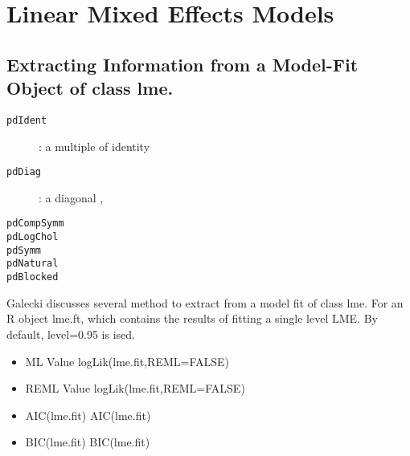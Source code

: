 \section{Linear Mixed Effects Models}
\subsection{Extracting Information from a Model-Fit Object of class lme.}


\begin{description}
\item[\texttt{pdIdent}]: a multiple of identity
\item[\texttt{pdDiag}]:  a diagonal ,

\item[\texttt{pdCompSymm}]
\item[\texttt{pdLogChol}]
\item[\texttt{pdSymm}]
\item[\texttt{pdNatural}]
\item[\texttt{pdBlocked}]
\end{description}








Galecki discusses several method to extract from a model fit of class lme.
For an R object lme.ft, which contains the results of fitting a single level LME.
By default, level=0.95 is ised.
\begin{itemize}
\item ML Value logLik(lme.fit,REML=FALSE)
\item REML Value logLik(lme.fit,REML=FALSE)
\item AIC(lme.fit) AIC(lme.fit)
\item BIC(lme.fit) BIC(lme.fit)
\end{itemize}

